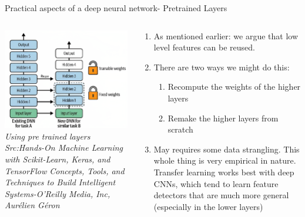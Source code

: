 \begin{frame}{Practical aspects of a deep neural network- Pretrained Layers}
	\begin{columns}[T]
        \begin{column}{0.4\textwidth}
        	\includegraphics[width=\textwidth]{images/pre-trainedLyers.png}
			\tiny{\textit{Using pre trained layers\\ Src:Hands-On Machine Learning with Scikit-Learn, Keras, and TensorFlow  Concepts, Tools, and Techniques to Build Intelligent Systems-O'Reilly Media, Inc, Aurélien Géron}}
        \end{column}
	    \begin{column}{0.6\textwidth} 
			\begin{enumerate}[$\bullet$]
				\item As mentioned earlier: we argue that low level features can be reused.\pause
				\item There are two ways we might do this:\pause
					\begin{enumerate}[$\bullet$]
						\item Recompute the weights of the higher layers\pause
						\item Remake the higher layers from scratch\pause
					\end{enumerate}
				\item May requires some data strangling. This whole thing is very empirical in nature. Transfer learning works best with deep
				CNNs, which tend to learn feature detectors that are
				much more general (especially in the lower layers)
			\end{enumerate}
    	\end{column}
    \end{columns}
\end{frame}


